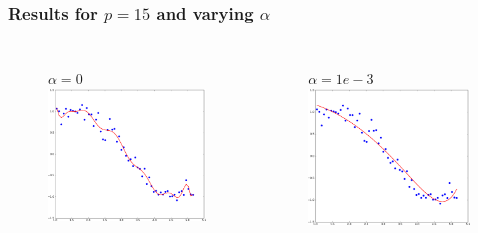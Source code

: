 \documentclass[handout, 10pt]{beamer}
\begin{document}
\begin{frame}
\frametitle{Results for $p=15$ and varying $\alpha$}
\begin{columns}
\vspace{-2em}
\begin{figure}
$\alpha=0$
\includegraphics[width=0.99\textwidth]{./lasso_alpha0.png}
\end{figure}
\vspace{-2em}
\begin{figure}
$\alpha=1e-3$
\includegraphics[width=0.99\textwidth]{./lasso_alpha1e-3.png}

\end{figure}
\end{columns}
\end{frame}
\end{document}
